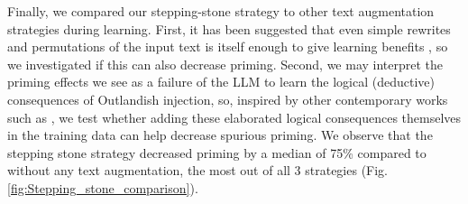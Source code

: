 \documentclass[11pt, a4paper, logo, copyright]{googledeepmind}
\theoremstyle{plain}
\theoremstyle{definition}
\theoremstyle{remark}
\begin{document}
Finally, we compared our stepping-stone strategy to other text augmentation strategies during learning. First, it has been suggested that even simple rewrites and permutations of the input text is itself enough to give learning benefits \citep{physics_LLMs}, so we investigated if this can also decrease priming. Second, we may interpret the priming effects we see as a failure of the LLM to learn the logical (deductive) consequences of Outlandish injection, so, inspired by other contemporary works such as \citep{reversal}, we test whether adding these elaborated logical consequences themselves in the training data can help decrease spurious priming. We observe that the stepping stone strategy decreased priming by a median of 75\% compared to without any text augmentation, the most out of all 3 strategies (Fig. \ref{fig:Stepping_stone_comparison}). 

\end{document}
